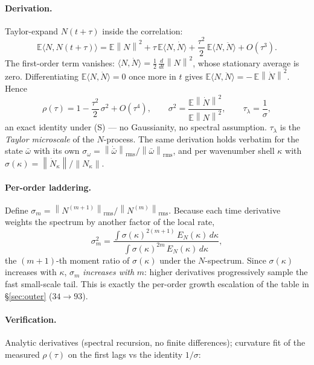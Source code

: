 \documentclass[11pt]{article}
\theoremstyle{remark}
\newcommand{\wbar}{\bar{\omega}}
\newcommand{\taul}{\tau_{\lambda}}
\newcommand{\norm}[1]{\left\lVert #1 \right\rVert}
\begin{document}
\paragraph{Derivation.}
Taylor-expand $N(t+\tau)$ inside the correlation:
\begin{equation}
\mathbb{E}\langle N, N(t+\tau)\rangle
= \mathbb{E}\norm{N}^2
+ \tau\,\mathbb{E}\langle N,\dot N\rangle
+ \frac{\tau^2}{2}\,\mathbb{E}\langle N,\ddot N\rangle
+ O(\tau^3).
\end{equation}
The first-order term vanishes:
$\langle N,\dot N\rangle = \tfrac12\,\frac{d}{dt}\norm{N}^2$, whose
stationary average is zero. Differentiating
$\mathbb{E}\langle N,\dot N\rangle = 0$ once more in $t$ gives
$\mathbb{E}\langle N,\ddot N\rangle = -\,\mathbb{E}\norm{\dot N}^2$. Hence
\begin{equation}\label{eq:identity}
\boxed{\;
\rho(\tau) = 1 - \frac{\tau^2}{2}\,\sigma^2 + O(\tau^4),
\qquad
\sigma^2 = \frac{\mathbb{E}\norm{\dot N}^2}{\mathbb{E}\norm{N}^2},
\qquad
\taul = \frac{1}{\sigma},
\;}
\end{equation}
an exact identity under (S) --- no Gaussianity, no spectral assumption.
$\taul$ is the \emph{Taylor microscale} of the $N$-process. The same
derivation holds verbatim for the state $\wbar$ with its own
$\sigma_\omega = \norm{\dot{\wbar}}_{\mathrm{rms}}/\norm{\wbar}_{\mathrm{rms}}$,
and per wavenumber shell $\kappa$ with
$\sigma(\kappa) = \norm{\dot N_\kappa}/\norm{N_\kappa}$.

\paragraph{Per-order laddering.}
Define $\sigma_m = \norm{N^{(m+1)}}_{\mathrm{rms}}/\norm{N^{(m)}}_{\mathrm{rms}}$.
Because each time derivative weights the spectrum by another factor of the
local rate,
\begin{equation}\label{eq:ladder}
\sigma_m^2
= \frac{\int \sigma(\kappa)^{2(m+1)}\,E_N(\kappa)\,d\kappa}
       {\int \sigma(\kappa)^{2m}\,E_N(\kappa)\,d\kappa},
\end{equation}
the $(m{+}1)$-th moment ratio of $\sigma(\kappa)$ under the $N$-spectrum.
Since $\sigma(\kappa)$ increases with $\kappa$, $\sigma_m$ \emph{increases
with} $m$: higher derivatives progressively sample the fast small-scale
tail. This is exactly the per-order growth escalation of the table in
\S\ref{sec:outer} ($34 \to 93$).

\paragraph{Verification.}
Analytic derivatives (spectral recursion, no finite differences); curvature
fit of the measured $\rho(\tau)$ on the first lags vs the identity
$1/\sigma$:
\end{document}
